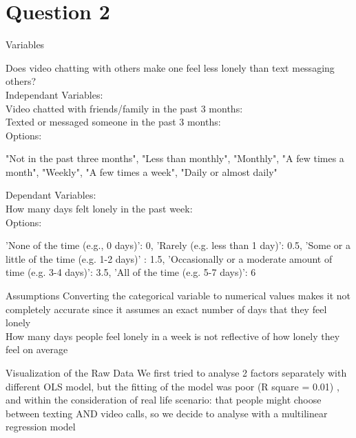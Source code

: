 \documentclass{beamer}
\begin{document}
\section{Question 2}
\begin{frame}{Variables}

Does video chatting with others make one feel less lonely than text messaging others?\\

Independant Variables:\\

Video chatted with friends/family in the past 3 months:\\

Texted or messaged someone in the past 3 months:\\

Options:
\begin{itemize}
    "Not in the past three months",
    "Less than monthly",
    "Monthly",
    "A few times a month",
    "Weekly",
    "A few times a week",
    "Daily or almost daily"
\end{itemize}

Dependant Variables:\\

How many days felt lonely in the past week:\\

Options:
\begin{itemize}
'None of the time (e.g., 0 days)': 0,
    'Rarely (e.g. less than 1 day)': 0.5,
    'Some or a little of the time (e.g. 1-2 days)' : 1.5,
    'Occasionally or a moderate amount of time (e.g. 3-4 days)': 3.5,
    'All of the time (e.g. 5-7 days)': 6
\end{itemize}
\end{frame}

\begin{frame}{Assumptions}
Converting the categorical variable to numerical values makes it not completely accurate since it assumes an exact number of days that they feel lonely\\


How many days people feel lonely in a week is not reflective of how lonely they feel on average\\
\end{frame}

\begin{frame}{Visualization of the Raw Data}
We first tried to analyse 2 factors separately with different OLS model, but the fitting of the model was poor (R square = 0.01) , and within the consideration of real life scenario: that people might choose between texting AND video calls, so we decide to analyse with a  multilinear regression model
\end{frame}
\end{document}
